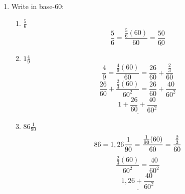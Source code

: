 \documentclass[12pt]{article}
\begin{document}
\begin{enumerate}
\begin{proof}
\begin{gather*}
                n|2^a3^b5^c
            \end{gather*}
            WLOG let $a=2m, b=c=m, \ m\in\mathbb{N}$. Then we have 
            \begin{gather*}
                n|2^{2m}3^m5^m \\
                n|{(2^2\cdot 3\cdot 5)}^m \\
                n|60^m
            \end{gather*} Thus $nz=60^m,\ z\in\mathbb{N}$, so 
            \[\frac{1}{n}=\frac{a_{1}60^m+a_{2}60^{m-1}+\cdots+a_m}{60^m}=\frac{a_1}{60}+\frac{a_2}{60^2}\cdots\frac{a_m}{60^m}\]
            $\therefore n$ is sexagesimally regular.
        \end{proof}
        \item Write in base-60:
        \begin{enumerate}
            \item $\frac{5}{6}$
            \[
              \frac{5}{6}=\frac{\frac{5}{6}(60)}{60} = \underline{\frac{50}{60}}
            \]
            \item $1\frac{4}{9}$
            \[
                \frac{4}{9} = \frac{\frac{4}{9}(60)}{60}=\frac{26}{60}+\frac{\frac{2}{3}}{60}\]
                \[\frac{26}{60}+\frac{\frac{2}{3}(60)}{60^2}=\frac{26}{60}+\frac{40}{60^2}
                \]
                \[\underline{1+\frac{26}{60}+\frac{40}{60^2}}\]
            \item $86\frac{1}{90}$
            \[
                86=1,26 \\
                \frac{1}{90}=\frac{\frac{1}{90}(60)}{60}=\frac{\frac{2}{3}}{60} \\
            \]
            \[\frac{\frac{2}{3}(60)}{60^2}=\frac{40}{60^2}\]
            \[\underline{1,26+\frac{40}{60^2}}\]
        \end{enumerate}
\end{enumerate}
\end{document}
